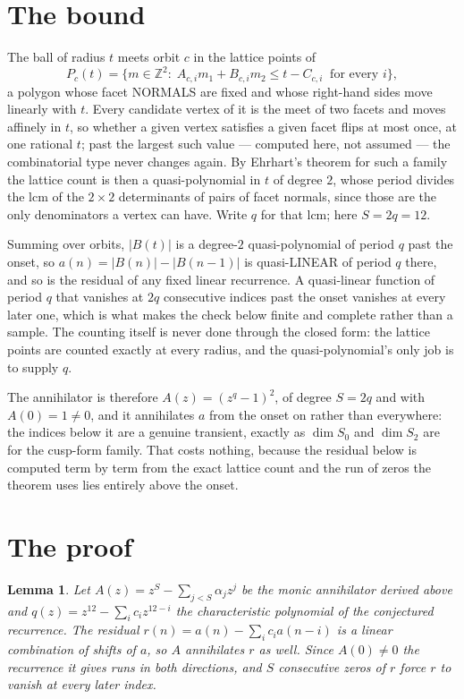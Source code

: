 \documentclass[11pt,a4paper]{article}
\theoremstyle{plain}
\newtheorem{lemma}[theorem]{Lemma}
\theoremstyle{definition}
\begin{document}
\section{The bound}

The ball of radius $t$ meets orbit $c$ in the lattice points of
\[
P_c(t)=\{m\in\mathbb{Z}^2:\;A_{c,i}m_1+B_{c,i}m_2\le t-C_{c,i}\ \text{ for every } i\},
\]
a polygon whose facet NORMALS are fixed and whose right-hand sides move linearly with $t$.
Every candidate vertex of it is the meet of two facets and moves affinely in $t$, so whether a
given vertex satisfies a given facet flips at most once, at one rational $t$; past the largest
such value --- computed here, not assumed --- the combinatorial type never changes again. By
Ehrhart's theorem for such a family the lattice count is then a quasi-polynomial in $t$ of
degree $2$, whose period divides the lcm of the $2\times2$ determinants of pairs of facet
normals, since those are the only denominators a vertex can have. Write $q$ for that lcm;
here $S=2q=12$.

Summing over orbits, $|B(t)|$ is a degree-$2$ quasi-polynomial of period $q$ past the onset,
so $a(n)=|B(n)|-|B(n-1)|$ is quasi-LINEAR of period $q$ there, and so is the residual of any
fixed linear recurrence. A quasi-linear function of period $q$ that vanishes at $2q$
consecutive indices past the onset vanishes at every later one, which is what makes the check
below finite and complete rather than a sample. The counting itself is never done through the
closed form: the lattice points are counted exactly at every radius, and the quasi-polynomial's
only job is to supply $q$.

The annihilator is therefore $A(z)=(z^{q}-1)^2$, of degree $S=2q$ and with $A(0)=1\ne0$, and
it annihilates $a$ from the onset on rather than everywhere: the indices below it are a
genuine transient, exactly as $\dim S_0$ and $\dim S_2$ are for the cusp-form family. That
costs nothing, because the residual below is computed term by term from the exact lattice
count and the run of zeros the theorem uses lies entirely above the onset.

\section{The proof}

\begin{lemma}\label{lem:crit}
Let $A(z)=z^S-\sum_{j<S}\alpha_jz^{j}$ be the monic annihilator derived above and
$q(z)=z^{12}-\sum_ic_iz^{12-i}$ the characteristic polynomial of the conjectured
recurrence. The residual $r(n)=a(n)-\sum_ic_ia(n-i)$ is a linear combination of shifts of $a$,
so $A$ annihilates $r$ as well. Since $A(0)\ne0$ the recurrence it gives runs in both
directions, and $S$ consecutive zeros of $r$ force $r$ to vanish at every later index.
\end{lemma}
\end{document}
